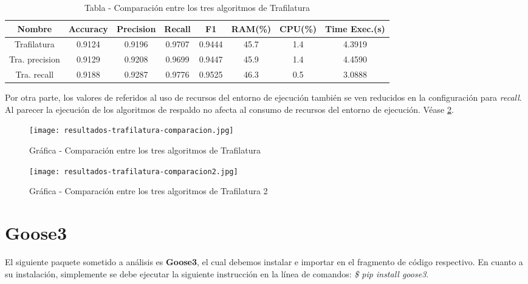 \begin{table}[h]
    \begin{center}
      \begin{tabular}{| c | c | c | c | c | c | c | c |} \hline 
       \textbf{Nombre} & \textbf{Accuracy} & \textbf{Precision}  & \textbf{Recall} & \textbf{F1} & \textbf{RAM(\%)} & \textbf{CPU(\%)} & \textbf{Time Exec.(s)} \\ \hline
       Trafilatura & 0.9124 & 0.9196 & 0.9707 & 0.9444 & 45.7 & 1.4 & 4.3919 \\ \hline
       Tra. precision & 0.9129 & 0.9208 & 0.9699 & 0.9447 & 45.9 & 1.4 & 4.4590 \\ \hline
       Tra. recall & 0.9188 & 0.9287 & 0.9776 & 0.9525 & 46.3 & 0.5 & 3.0888 \\ \hline
      \end{tabular}
      \caption{Tabla - Comparación entre los tres algoritmos de Trafilatura}
      \label{tab:tabla - comparacion entre los tres algoritmos de trafilatura}
    \end{center}
\end{table}

Por otra parte, los valores de referidos al uso de recursos del entorno de ejecución también se ven
reducidos en la configuración para \emph{recall}. Al parecer la ejecución de los algoritmos de respaldo no
afecta al consumo de recursos del entorno de ejecución. Véase 
\ref{img:grafica - comparacion entre los tres algoritmos de trafilatura 2}.

\begin{figure}[tphb]
    \centering
    \texttt{[image: resultados-trafilatura-comparacion.jpg]}
    \caption{Gráfica - Comparación entre los tres algoritmos de Trafilatura}
    \label{img:grafica - comparacion entre los tres algoritmos de trafilatura}
\end{figure}

\begin{figure}[tphb]
    \centering
    \texttt{[image: resultados-trafilatura-comparacion2.jpg]}
    \caption{Gráfica - Comparación entre los tres algoritmos de Trafilatura 2}
    \label{img:grafica - comparacion entre los tres algoritmos de trafilatura 2}
\end{figure}

\section*{Goose3}

El siguiente paquete sometido a análisis es \textbf{Goose3}, el cual debemos instalar e importar en el 
fragmento de código respectivo. En cuanto a su instalación, simplemente se debe ejecutar la siguiente 
instrucción en la línea de comandos: \emph{\$ pip install goose3}.

